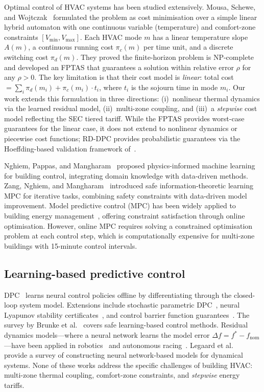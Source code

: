 \documentclass[12pt]{article}
\theoremstyle{plain}
\theoremstyle{definition}
\begin{document}
Optimal control of HVAC systems has been studied extensively. Mousa, Schewe, and Wojtczak~\cite{mousa2018optimal} formulated the problem as cost minimisation over a simple linear hybrid automaton with one continuous variable (temperature) and comfort-zone constraints $[V_{\min}, V_{\max}]$. Each HVAC mode $m$ has a linear temperature slope $A(m)$, a continuous running cost $\pi_c(m)$ per time unit, and a discrete switching cost $\pi_d(m)$. They proved the finite-horizon problem is NP-complete and developed an FPTAS that guarantees a solution within relative error $\rho$ for any $\rho > 0$. The key limitation is that their cost model is \emph{linear}: total cost $= \sum_i \pi_d(m_i) + \pi_c(m_i) \cdot t_i$, where $t_i$ is the sojourn time in mode $m_i$. Our work extends this formulation in three directions: (i)~nonlinear thermal dynamics via the learned residual model, (ii)~multi-zone coupling, and (iii)~a \emph{stepwise} cost model reflecting the SEC tiered tariff. While the FPTAS provides worst-case guarantees for the linear case, it does not extend to nonlinear dynamics or piecewise cost functions; RD-DPC provides probabilistic guarantees via the Hoeffding-based validation framework of~\cite{drgona2024dpc,hertneck2018approximate}.

Nghiem, Pappas, and Mangharam~\cite{nghiem2023physics} proposed physics-informed machine learning for building control, integrating domain knowledge with data-driven methods. Zang, Nghiem, and Mangharam~\cite{zang2025sit} introduced safe information-theoretic learning MPC for iterative tasks, combining safety constraints with data-driven model improvement. Model predictive control (MPC) has been widely applied to building energy management~\cite{mesbah2022fusion,oldewurtel2010peak}, offering constraint satisfaction through online optimisation. However, online MPC requires solving a constrained optimisation problem at each control step, which is computationally expensive for multi-zone buildings with 15-minute control intervals.

\subsection{Learning-based predictive control}

DPC~\cite{drgona2024dpc,drgona2022dpc_jpc} learns neural control policies offline by differentiating through the closed-loop system model. Extensions include stochastic parametric DPC~\cite{drgona2022stochastic}, neural Lyapunov stability certificates~\cite{mukherjee2022neural}, and control barrier function guarantees~\cite{cortez2022dpc_cbf}. The survey by Brunke et al.~\cite{brunke2022safe} covers safe learning-based control methods. Residual dynamics models---where a neural network learns the model error $\Delta f = f^* - f_{\text{nom}}$---have been applied in robotics~\cite{salzmann2023neural,chee2022knode} and autonomous racing~\cite{xue2024learning}. Legaard et al.~\cite{legaard2023constructing} provide a survey of constructing neural network-based models for dynamical systems. None of these works address the specific challenges of building HVAC: multi-zone thermal coupling, comfort-zone constraints, and \emph{stepwise} energy tariffs.
\end{document}
